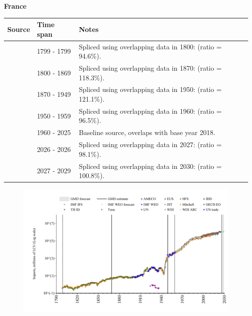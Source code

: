 \documentclass[12pt,a4paper,landscape]{article}
\begin{document}
\begin{adjustbox}{max totalsize={\paperwidth}{\paperheight},center}
\begin{minipage}[t][\textheight][t]{\textwidth}
\vspace*{0.5cm}
{}
\begin{center}
{\Large\bfseries France}
\end{center}
\vspace{0.5cm}
\begin{table}[H]
\centering
\small
\begin{tabular}{|l|l|l|}
\hline
\textbf{Source} & \textbf{Time span} & \textbf{Notes} \\
\hline
\rowcolor{white}\cite{Mitchell}& 1799 - 1799 &Spliced using overlapping data in 1800: (ratio = 94.6\%).\\
\rowcolor{lightgray}\cite{Tena}& 1800 - 1869 &Spliced using overlapping data in 1870: (ratio = 118.3\%).\\
\rowcolor{white}\cite{JST}& 1870 - 1949 &Spliced using overlapping data in 1950: (ratio = 121.1\%).\\
\rowcolor{lightgray}\cite{IMF_IFS}& 1950 - 1959 &Spliced using overlapping data in 1960: (ratio = 96.5\%).\\
\rowcolor{white}\cite{OECD_EO}& 1960 - 2025 &Baseline source, overlaps with base year 2018.\\
\rowcolor{lightgray}\cite{AMECO}& 2026 - 2026 &Spliced using overlapping data in 2027: (ratio = 98.1\%).\\
\rowcolor{white}\cite{IMF_WEO_forecast}& 2027 - 2029 &Spliced using overlapping data in 2030: (ratio = 100.8\%).\\
\hline
\end{tabular}
\end{table}
\begin{figure}[H]
\centering
\includegraphics[width=\textwidth,height=0.6\textheight,keepaspectratio]{graphs/FRA_imports.pdf}
\end{figure}
\end{minipage}
\end{adjustbox}
\end{document}
